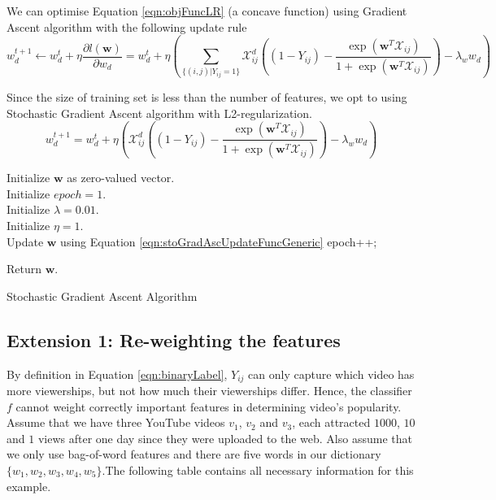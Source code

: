 We can optimise Equation \ref{eqn:objFuncLR} (a concave function) using Gradient Ascent algorithm with the following update rule
	\begin{equation}
	w^{t+1}_d \leftarrow w^t_d + \eta \frac{\partial l(\textbf{w})}{\partial w_d} = w^t_d + \eta (\sum_{\{(i,j)|Y_{ij}=1\}} \mathcal{X}_{ij}^d ( (1 - Y_{ij}) - \frac{\exp(\textbf{w}^T\mathcal{X}_{ij})}{1 + \exp(\textbf{w}^T\mathcal{X}_{ij})})  - \lambda_w w_d)
	\end{equation}

Since the size of training set is less than the number of features, we opt to using Stochastic Gradient Ascent algorithm with L2-regularization.
	\begin{equation}
	\label{eqn:stoGradAscUpdateFunc}
	w^{t+1}_d = w^t_d + \eta (\mathcal{X}_{ij}^d ( (1 - Y_{ij}) - \frac{\exp(\textbf{w}^T\mathcal{X}_{ij})}{1 + \exp(\textbf{w}^T\mathcal{X}_{ij})})  - \lambda_w w_d)
	\end{equation}

\begin{algorithm}[h]\small
Initialize $\textbf{w}$ as zero-valued vector.\\
Initialize $epoch = 1$.\\
Initialize $\lambda = 0.01$.\\
Initialize $\eta = 1$.\\

 {
	 {
		Update $\textbf{w}$ using Equation \ref{eqn:stoGradAscUpdateFuncGeneric}
	}    
	epoch++;
}

Return $\textbf{w}$.
\caption{Stochastic Gradient Ascent Algorithm} \label{algo:stoGradAsc}
\end{algorithm}

\subsection{Extension 1: Re-weighting the features}
\label{subsec:ext1}
By definition in Equation \ref{eqn:binaryLabel}, $Y_{ij}$ can only capture which video has more viewerships, but not how much their viewerships differ. Hence, the classifier $f$ cannot weight correctly important features in determining video's popularity. Assume that we have three YouTube videos $v_1$, $v_2$ and $v_3$, each attracted $1000$, $10$ and $1$ views after one day since they were uploaded to the web. Also assume that we only use bag-of-word features and there are five words in our dictionary $\{w_1, w_2, w_3, w_4, w_5\}$.The following table contains all necessary information for this example.

